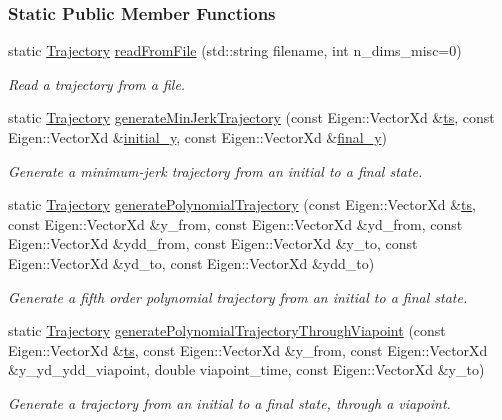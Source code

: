 \subsubsection*{Static Public Member Functions}
\begin{DoxyCompactItemize}
\item 
static \hyperlink{classDmpBbo_1_1Trajectory}{Trajectory} \hyperlink{classDmpBbo_1_1Trajectory_aac7e666c7fa5ea89ec1ba884e0a118a0}{read\+From\+File} (std\+::string filename, int n\+\_\+dims\+\_\+misc=0)
\begin{DoxyCompactList}\small\item\em Read a trajectory from a file. \end{DoxyCompactList}\item 
static \hyperlink{classDmpBbo_1_1Trajectory}{Trajectory} \hyperlink{classDmpBbo_1_1Trajectory_ae48669ea3eb155cd549c4bfbdc3f480a}{generate\+Min\+Jerk\+Trajectory} (const Eigen\+::\+Vector\+Xd \&\hyperlink{classDmpBbo_1_1Trajectory_a0ac526fb2e2e77134906a4b657d795d2}{ts}, const Eigen\+::\+Vector\+Xd \&\hyperlink{classDmpBbo_1_1Trajectory_ab8f4e6185b63fbd140438b09cd130eb2}{initial\+\_\+y}, const Eigen\+::\+Vector\+Xd \&\hyperlink{classDmpBbo_1_1Trajectory_aeb94e68102be7c8e5885e7f1ccf487e2}{final\+\_\+y})
\begin{DoxyCompactList}\small\item\em Generate a minimum-\/jerk trajectory from an initial to a final state. \end{DoxyCompactList}\item 
static \hyperlink{classDmpBbo_1_1Trajectory}{Trajectory} \hyperlink{classDmpBbo_1_1Trajectory_ab6d25078b7d7df08ad3cd8772d969034}{generate\+Polynomial\+Trajectory} (const Eigen\+::\+Vector\+Xd \&\hyperlink{classDmpBbo_1_1Trajectory_a0ac526fb2e2e77134906a4b657d795d2}{ts}, const Eigen\+::\+Vector\+Xd \&y\+\_\+from, const Eigen\+::\+Vector\+Xd \&yd\+\_\+from, const Eigen\+::\+Vector\+Xd \&ydd\+\_\+from, const Eigen\+::\+Vector\+Xd \&y\+\_\+to, const Eigen\+::\+Vector\+Xd \&yd\+\_\+to, const Eigen\+::\+Vector\+Xd \&ydd\+\_\+to)
\begin{DoxyCompactList}\small\item\em Generate a fifth order polynomial trajectory from an initial to a final state. \end{DoxyCompactList}\item 
static \hyperlink{classDmpBbo_1_1Trajectory}{Trajectory} \hyperlink{classDmpBbo_1_1Trajectory_a8e4bc03c6f535f4c9983ffe77a2d971b}{generate\+Polynomial\+Trajectory\+Through\+Viapoint} (const Eigen\+::\+Vector\+Xd \&\hyperlink{classDmpBbo_1_1Trajectory_a0ac526fb2e2e77134906a4b657d795d2}{ts}, const Eigen\+::\+Vector\+Xd \&y\+\_\+from, const Eigen\+::\+Vector\+Xd \&y\+\_\+yd\+\_\+ydd\+\_\+viapoint, double viapoint\+\_\+time, const Eigen\+::\+Vector\+Xd \&y\+\_\+to)
\begin{DoxyCompactList}\small\item\em Generate a trajectory from an initial to a final state, through a viapoint. \end{DoxyCompactList}\end{DoxyCompactItemize}
